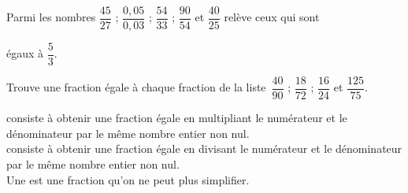 \begin{methode*1}
 
  \exercice
Parmi les nombres $\dfrac{45}{27}$ ; $\dfrac{0,05}{0,03}$ ; $\dfrac{54}{33}$ ; $\dfrac{90}{54}$ et $\dfrac{40}{25}$ relève ceux qui sont

égaux à $\dfrac{5}{3}$.

  \exercice
  Trouve une fraction égale à chaque fraction de la liste $\dfrac{40}{90}$ ; $\dfrac{18}{72}$ ; $\dfrac{16}{24}$ et $\dfrac{125}{75}$.

 \end{methode*1}


\begin{aconnaitre}
 consiste à obtenir une fraction égale en multipliant le numérateur et le dénominateur par le même nombre entier non nul. \\[0.5em]
 consiste à obtenir une fraction égale en divisant le numérateur et le dénominateur par le même nombre entier non nul. \\[0.5em]
Une  est une fraction qu'on ne peut plus simplifier.
\end{aconnaitre}


